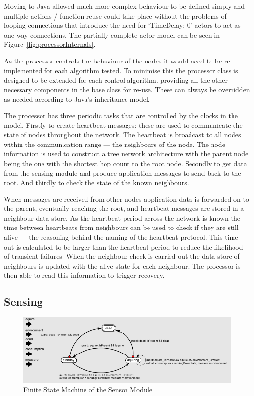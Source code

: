 \documentclass[authoryearcitations]{UoYCSproject}
\begin{document}
Moving to Java allowed much more complex behaviour to be defined simply and multiple actions / function reuse could take place without the problems of looping connections that introduce the need for `TimeDelay: 0' actors to act as one way connections. The partially complete actor model can be seen in Figure~\ref{fig:processorInternals}.

As the processor controls the behaviour of the nodes it would need to be re-implemented for each algorithm tested. To minimise this the processor class is designed to be extended for each control algorithm, providing all the other necessary components in the base class for re-use. These can always be overridden as needed according to Java's inheritance model.

The processor has three periodic tasks that are controlled by the clocks in the model. Firstly to create heartbeat messages: these are used to communicate the state of nodes throughout the network. The heartbeat is broadcast to all nodes within the communication range --- the neighbours of the node. The node information is used to construct a tree network architecture with the parent node being the one with the shortest hop count to the root node. Secondly to get data from the sensing module and produce application messages to send back to the root. And thirdly to check the state of the known neighbours.

When messages are received from other nodes application data is forwarded on to the parent, eventually reaching the root, and heartbeat messages are stored in a neighbour data store. As the heartbeat period across the network is known the time between heartbeats from neighbours can be used to check if they are still alive --- the reasoning behind the naming of the heartbeat protocol. This time-out is calculated to be larger than the heartbeat period to reduce the likelihood of transient failures. When the neighbour check is carried out the data store of neighbours is updated with the alive state for each neighbour. The processor is then able to read this information to trigger recovery.

\subsection{Sensing}

\begin{figure}
 \centering
    \includegraphics[width=\textwidth]{figures/sensor_Controller.png}
    \caption{Finite State Machine of the Sensor Module}
    \label{fig:sensorControl}
\end{figure}
\end{document}

